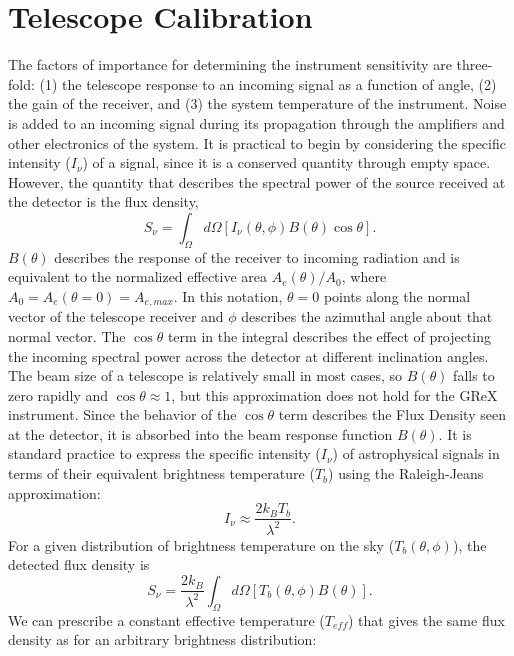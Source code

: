 \section{Telescope Calibration}\label{sec:Acalibration}
The factors of importance for determining the instrument sensitivity are three-fold: (1) the telescope response to an incoming signal as a function of angle, (2) the gain of the receiver, and (3) the system temperature of the instrument. 
Noise is added to an incoming signal during its propagation through the amplifiers and other electronics of the system. 
It is practical to begin by considering the specific intensity ($I_\nu$) of a signal, since it is a conserved quantity through empty space. 
However, the quantity that describes the spectral power of the source received at the detector is the flux density,
\begin{equation}
    S_\nu=\int_\Omega d\Omega\left[I_\nu(\theta,\phi)B(\theta)\cos\theta\right].\label{eq:flux_density}
\end{equation}
$B(\theta)$ describes the response of the receiver to incoming radiation and is equivalent to the normalized effective area $A_{e}(\theta)/A_0$, where $A_0=A_e(\theta=0)=A_{e,max}$. 
In this notation, $\theta=0$ points along the normal vector of the telescope receiver and $\phi$ describes the azimuthal angle about that normal vector.
The $\cos\theta$ term in the integral describes the effect of projecting the incoming spectral power across the detector at different inclination angles. 
The beam size of a telescope is relatively small in most cases, so $B(\theta)$ falls to zero rapidly and $\cos\theta\approx1$, but this approximation does not hold for the GReX instrument. 
Since the behavior of the $\cos\theta$ term describes the Flux Density seen at the detector, it is absorbed into the beam response function $B(\theta)$.
It is standard practice to express the specific intensity ($I_\nu$) of astrophysical signals in terms of their equivalent brightness temperature ($T_b$) using the Raleigh-Jeans approximation:
\begin{equation}
    I_\nu \approx \frac{2k_B T_b}{\lambda^2}. \label{eq:RJ}
\end{equation}
For a given distribution of brightness temperature on the sky ($T_b(\theta,\phi)$), the detected flux density is 
\begin{equation}
    S_\nu=\frac{2k_B}{\lambda^2}\int_\Omega d\Omega\left[T_b(\theta,\phi)B(\theta)\right].\label{eq:FDT}
\end{equation}
We can prescribe a constant effective temperature ($T_{eff}$) that gives the same flux density as for an arbitrary brightness distribution:
